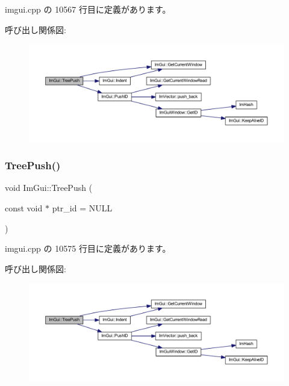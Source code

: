  imgui.\+cpp の 10567 行目に定義があります。

呼び出し関係図\+:\nopagebreak
\begin{figure}[H]
\begin{center}
\leavevmode
\includegraphics[width=350pt]{namespace_im_gui_a596151d99bca5cc0b6393809c1e07af5_cgraph}
\end{center}
\end{figure}
\mbox{\label{namespace_im_gui_a71440d86edee2b23abc25cb80e9c9444}} 
\subsubsection{\texorpdfstring{Tree\+Push()}{TreePush()}\hspace{0.1cm}{\footnotesize\ttfamily [2/2]}}
{\footnotesize\ttfamily void Im\+Gui\+::\+Tree\+Push (\begin{DoxyParamCaption}\item[{const void $\ast$}]{ptr\+\_\+id = {\ttfamily NULL} }\end{DoxyParamCaption})}



 imgui.\+cpp の 10575 行目に定義があります。

呼び出し関係図\+:\nopagebreak
\begin{figure}[H]
\begin{center}
\leavevmode
\includegraphics[width=350pt]{namespace_im_gui_a71440d86edee2b23abc25cb80e9c9444_cgraph}
\end{center}
\end{figure}
\mbox{\label{namespace_im_gui_afddcddce9f2801769e4c79ef769ab600}} 
